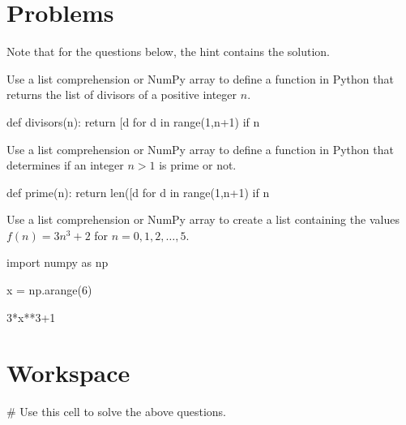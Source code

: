 \documentclass{ximera}
\begin{document}
\section{Problems}

Note that for the questions below, the hint contains the solution.

\begin{question}
Use a list comprehension or NumPy array to define a function in Python that returns the list of divisors of a positive integer $n$.
	\begin{hint}
\begin{sageCell}
def divisors(n):
        return [d for d in range(1,n+1) if n%
\end{sageCell}
	\end{hint}
\end{question}

\begin{question}
Use a list comprehension or NumPy array to define a function in Python that determines if an integer $n>1$ is prime or not.
	\begin{hint}
\begin{sageCell}
def prime(n):
        return len([d for d in range(1,n+1) if n%
\end{sageCell}
	\end{hint}
\end{question}

\begin{question}
	Use a list comprehension or NumPy array to create a list containing the values $f(n)=3n^3+2$ for $n=0,1,2,\dots,5$.
	\begin{hint}
\begin{sageCell}
import numpy as np

x = np.arange(6)

3*x**3+1
\end{sageCell}
	\end{hint}
\end{question}

\section{Workspace}

\begin{sageCell}
# Use this cell to solve the above questions.
\end{sageCell}
\end{document}
